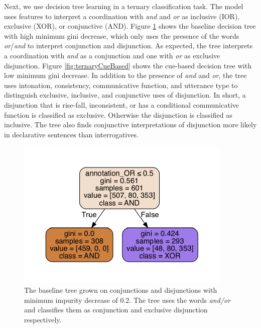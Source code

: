 \documentclass[floatsintext,man]{apa6}
\theoremstyle{definition}
\theoremstyle{definition}
\theoremstyle{definition}
\theoremstyle{remark}
\begin{document}
Next, we use decision tree learning in a ternary classification task.
The model uses features to interpret a coordination with \emph{and} and
\emph{or} as inclusive (IOR), exclusive (XOR), or conjunctive (AND).
Figure \ref{fig:ternaryBaseline} shows the baseline decision tree with
high minimum gini decrease, which only uses the presence of the words
\emph{or}/\emph{and} to interpret conjunction and disjunction. As
expected, the tree interprets a coordination with \emph{and} as a
conjunction and one with \emph{or} as exclusive disjunction. Figure
\ref{fig:ternaryCueBased} shows the cue-based decision tree with low
minimum gini decrease. In addition to the presence of \emph{and} and
\emph{or}, the tree uses intonation, consistency, communicative
function, and utterance type to distinguish exclusive, inclusive, and
conjunctive uses of disjunction. In short, a disjunction that is
rise-fall, inconsistent, or has a conditional communicative function is
classified as exclusive. Otherwise the disjunction is classified as
inclusive. The tree also finds conjunctive interpretations of
disjunction more likely in declarative sentences than interrogatives.

\begin{figure}
\centering
\includegraphics{figs/ternaryBaseline-1.pdf}
\caption{\label{fig:ternaryBaseline}The baseline tree grown on conjunctions
and disjunctions with minimum impurity decrease of 0.2. The tree uses
the words \textit{and/or} and classifies them as conjunction and
exclusive disjunction respectively.}
\end{figure}
\end{document}
